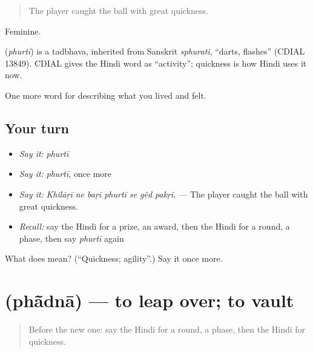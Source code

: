\begin{quote}
The player caught the ball with great quickness.
\end{quote}

Feminine.

\begin{cousinweb}
\textbf{} (\emph{phurtī}) is a tadbhava, inherited from Sanskrit \emph{sphurati}, \textquotedblleft{}darts, flashes\textquotedblright{} (CDIAL 13849). CDIAL gives the Hindi word as \textquotedblleft{}activity\textquotedblright{}; quickness is how Hindi uses it now.
\end{cousinweb}

\begin{grammarlens}[title={What you've built}]
One more word for describing what you lived and felt.
\end{grammarlens}

\subsection*{Your turn}
\begin{itemize}
\raggedright
  \item \emph{Say it:} \emph{phurtī}
  \item \emph{Say it:} \emph{phurtī}, once more
  \item \emph{Say it:} \emph{Khilāṛī ne baṛī phurtī se gẽd pakṛī.} — The player caught the ball with great quickness.
  \item \emph{Recall:} say the Hindi for a prize, an award, then the Hindi for a round, a phase, then say \emph{phurtī} again
\end{itemize}

\begin{tcolorbox}[breakable,colback=teal!4,colframe=teal!35!black,title={Before you move on}]
What does  mean? (\textquotedblleft{}Quickness; agility\textquotedblright{}.) Say it once more.
\end{tcolorbox}
\section[\texorpdfstring{\hi{फाँदना} (phā̃dnā)}{फाँदना (phā̃dnā)}]{ (phā̃dnā) — to leap over; to vault}

\label{lesson:HI-C535-phadna}



\begin{quote}
Before the new one: say the Hindi for a round, a phase, then the Hindi for quickness.
\end{quote}

